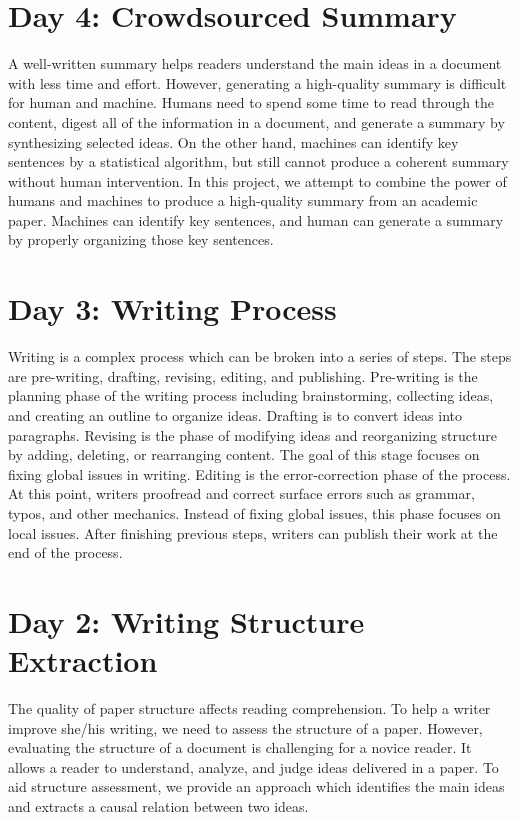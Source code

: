 \documentclass[a4paper]{article}
\begin{document}
\section{Day 4: Crowdsourced Summary}
A well-written summary helps readers understand the main ideas in a document with less time and effort. However, generating a high-quality summary is difficult for human and machine. Humans need to spend some time to read through the content, digest all of the information in a document, and generate a summary by synthesizing selected ideas. On the other hand, machines can identify key sentences by a statistical algorithm, but still cannot produce a coherent summary without human intervention. In this project, we attempt to combine the power of humans and machines to produce a high-quality summary from an academic paper. Machines can identify key sentences, and human can generate a summary by properly organizing those key sentences.

\section{Day 3: Writing Process}
Writing is a complex process which can be broken into a series of steps. The steps are pre-writing, drafting, revising, editing, and publishing. Pre-writing is the planning phase of the writing process including brainstorming, collecting ideas, and creating an outline to organize ideas. Drafting is to convert ideas into paragraphs. Revising is the phase of modifying ideas and reorganizing structure by adding, deleting, or rearranging content. The goal of this stage focuses on fixing global issues in writing. Editing is the error-correction phase of the process. At this point, writers proofread and correct surface errors such as grammar, typos, and other mechanics. Instead of fixing global issues, this phase focuses on local issues. After finishing previous steps, writers can publish their work at the end of the process.

\section{Day 2: Writing Structure Extraction}
The quality of paper structure affects reading comprehension. To help a writer improve she/his writing, we need to assess the structure of a paper. However, evaluating the structure of a document is challenging for a novice reader. It allows a reader to understand, analyze, and judge ideas delivered in a paper. To aid structure assessment, we provide an approach which identifies the main ideas and extracts a causal relation between two ideas.
\end{document}
